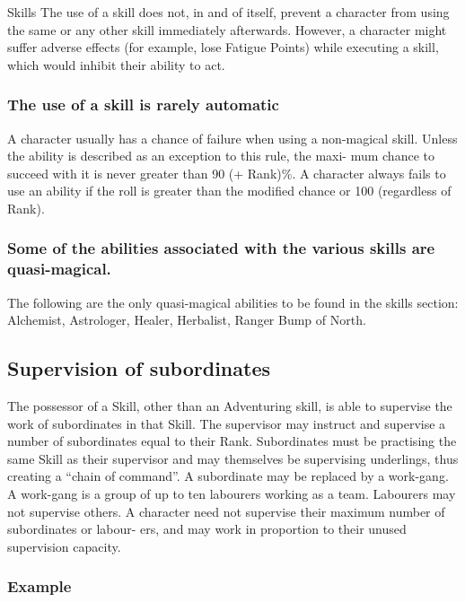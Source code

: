 \begin{Chapter}{Skills}
The use of a skill does not, in and of itself, prevent a character
from using the same or any other skill immediately afterwards.
However, a character might suffer adverse effects (for example, lose
Fatigue Points) while executing a skill, which would inhibit their
ability to act.

\subsubsection{The use of a skill is rarely automatic}

A character usually has a chance of failure when using a non-magical
skill.  Unless the ability is described as an exception to this rule,
the maxi- mum chance to succeed with it is never greater than 90 (+
Rank)\%.  A character always fails to use an ability if the roll is
greater than the modified chance or 100 (regardless of Rank).

\subsubsection{Some of the abilities associated with the various skills are
quasi-magical.}

The following are the only quasi-magical abilities to be found in the
skills section: Alchemist, Astrologer, Healer, Herbalist, Ranger Bump
of North.

\subsection{Supervision of subordinates}

The possessor of a Skill, other than an Adventuring skill, is able to
supervise the work of subordinates in that Skill.  The supervisor may
instruct and supervise a number of subordinates equal to their Rank.
Subordinates must be practising the same Skill as their supervisor and
may themselves be supervising underlings, thus creating a “chain of
command”.  A subordinate may be replaced by a work-gang.  A work-gang
is a group of up to ten labourers working as a team.  Labourers may
not supervise others.  A character need not supervise their maximum
number of subordinates or labour- ers, and may work in proportion to
their unused supervision capacity.

\subsubsection{Example}


\end{Chapter}
